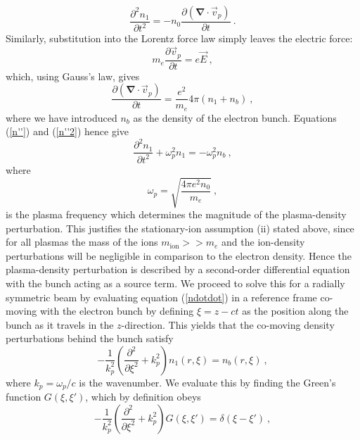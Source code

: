 \begin{equation}
\frac{\partial^2 n_1}{\partial t^2}= -n_0\frac{\partial (\mathbf{\nabla}\cdot\vec{v}_p)}{\partial t}~.
\label{n''}
\end{equation}
Similarly, substitution into the Lorentz force law simply leaves the electric force:
\begin{equation}
 m_e\frac{\partial \vec{v}_p}{\partial t}= e\vec{E}~,
 \label{lorentz_force_plasma}
\end{equation} %
which, using Gauss's law, gives
\begin{equation}
\frac{\partial (\mathbf{\nabla}\cdot\vec{v}_p)}{\partial t}= \frac{e^2}{m_e}4\pi (n_1+n_b)~,
\label{n''2}
\end{equation}
where we have introduced $n_b$ as the density of the electron bunch. Equations (\ref{n''}) and (\ref{n''2}) hence give
\begin{equation}
\frac{\partial^2 n_1}{\partial t^2}+\omega_p^2n_1=-\omega_p^2n_b~,
\label{ndotdot}
\end{equation}
where 
\begin{equation}
\omega_p=\sqrt{\frac{4\pi e^2n_0}{m_e} }~,
\label{plasma_frequency}
\end{equation}
is the plasma frequency which determines the magnitude of the plasma-density perturbation. This justifies the stationary-ion assumption (ii) stated above, since for all plasmas the mass of the ions $m_{\text{ion}}>>m_{e}$ and the ion-density perturbations will be negligible in comparison to the electron density. Hence the plasma-density perturbation is described by a second-order differential equation with the bunch acting as a source term. We proceed to solve this for a radially symmetric beam by evaluating equation (\ref{ndotdot}) in a reference frame co-moving with the electron bunch \cite{Dawson1959} by defining $\xi=z-ct$ as the position along the bunch as it travels in the $z$-direction. This yields that the co-moving density perturbations behind the bunch satisfy
\begin{equation}
-\frac{1}{k_p^2}\left(\frac{\partial^2 }{\partial \xi^2}+k_p^2\right)n_1\left(r,\xi \right)=n_b\left(r,\xi \right) ~,
\end{equation}  %
where $k_p=\omega_p/c$ is the wavenumber. We evaluate this by finding the Green's function $G\left(\xi,\xi'\right)$, which by definition obeys 
\begin{equation}
-\frac{1}{k_p^2}\left(\frac{\partial^2 }{\partial \xi^2}+k_p^2\right)G\left(\xi,\xi'\right)=\delta\left(\xi-\xi'\right)~,
\label{density_greens}
\end{equation}
